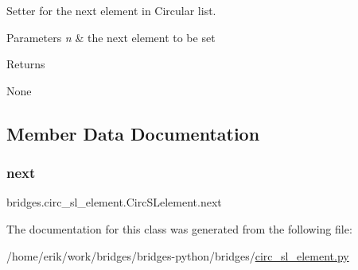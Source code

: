 Setter for the next element in Circular list. 


\begin{DoxyParams}{Parameters}
{\em n} & the next element to be set \\
\hline
\end{DoxyParams}
\begin{DoxyReturn}{Returns}

\end{DoxyReturn}
\begin{DoxyParagraph}{None}

\end{DoxyParagraph}


\subsection{Member Data Documentation}
\mbox{\label{classbridges_1_1circ__sl__element_1_1_circ_s_lelement_afc8fa34bcbc539e7966db5ec471e3959}} 
\subsubsection{\texorpdfstring{next}{next}}
{\footnotesize\ttfamily bridges.\+circ\+\_\+sl\+\_\+element.\+Circ\+S\+Lelement.\+next}



The documentation for this class was generated from the following file\+:\begin{DoxyCompactItemize}
\item 
/home/erik/work/bridges/bridges-\/python/bridges/\hyperlink{circ__sl__element_8py}{circ\+\_\+sl\+\_\+element.\+py}\end{DoxyCompactItemize}

